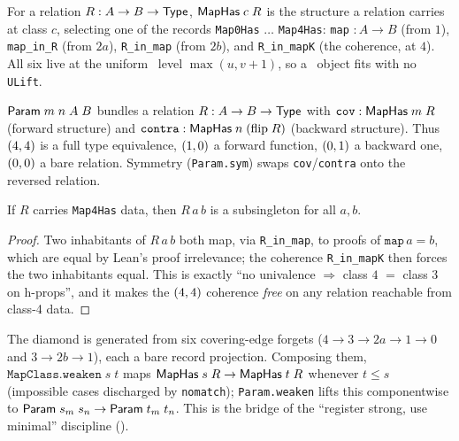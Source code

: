 \begin{definition}
  \label{def:map-has}
  \leanok
  For a relation $R : A \to B \to \mathsf{Type}$, $\mathsf{MapHas}\;c\;R$ is the structure a
  relation carries at class $c$, selecting one of the records
  \texttt{Map0Has} $\ldots$ \texttt{Map4Has}: \texttt{map} $:A\to B$
  (from $1$), \texttt{map\_in\_R} (from $2a$), \texttt{R\_in\_map} (from $2b$),
  and \texttt{R\_in\_mapK} (the coherence, at $4$). All six live at the uniform
  \SortU\ level $\max(u, v{+}1)$, so a \PropSort\ object fits with no \texttt{ULift}.
\end{definition}

\begin{definition}
  \label{def:param}
  \leanok
  $\mathsf{Param}\;m\;n\;A\;B$ bundles a relation $R : A \to B \to \mathsf{Type}$ with
  $\texttt{cov} : \mathsf{MapHas}\;m\;R$ (forward structure) and
  $\texttt{contra} : \mathsf{MapHas}\;n\;(\mathrm{flip}\;R)$ (backward structure). Thus
  $(4,4)$ is a full type equivalence, $(1,0)$ a forward function,
  $(0,1)$ a backward one, $(0,0)$ a bare relation. Symmetry
  (\texttt{Param.sym}) swaps \texttt{cov}/\texttt{contra} onto the reversed
  relation.
\end{definition}

\begin{lemma}
  \label{lem:map4-subsingleton}
  \leanok
  If $R$ carries \texttt{Map4Has} data, then $R\,a\,b$ is a subsingleton for all
  $a, b$.
\end{lemma}
\begin{proof}
  \leanok
  Two inhabitants of $R\,a\,b$ both map, via \texttt{R\_in\_map}, to proofs of
  $\texttt{map}\,a = b$, which are equal by Lean's proof irrelevance; the
  coherence \texttt{R\_in\_mapK} then forces the two inhabitants equal. This is
  exactly ``no univalence $\Rightarrow$ class $4$ $=$ class $3$ on h-props'',
  and it makes the $(4,4)$ coherence \emph{free} on any relation reachable
  from class-4 data.
\end{proof}

\begin{definition}[Weakening]
  \label{def:weaken}
  \leanok
  The diamond is generated from six covering-edge forgets
  ($4 \to 3 \to 2a \to 1 \to 0$ and $3 \to 2b \to 1$), each a bare record
  projection. Composing them, $\texttt{MapClass.weaken}\;s\;t$ maps
  $\mathsf{MapHas}\;s\;R \to \mathsf{MapHas}\;t\;R$ whenever $t \leq s$ (impossible cases
  discharged by \texttt{nomatch}); \texttt{Param.weaken} lifts this
  componentwise to $\mathsf{Param}\;s_m\;s_n \to \mathsf{Param}\;t_m\;t_n$. This is the bridge of
  the ``register strong, use minimal'' discipline ().
\end{definition}

